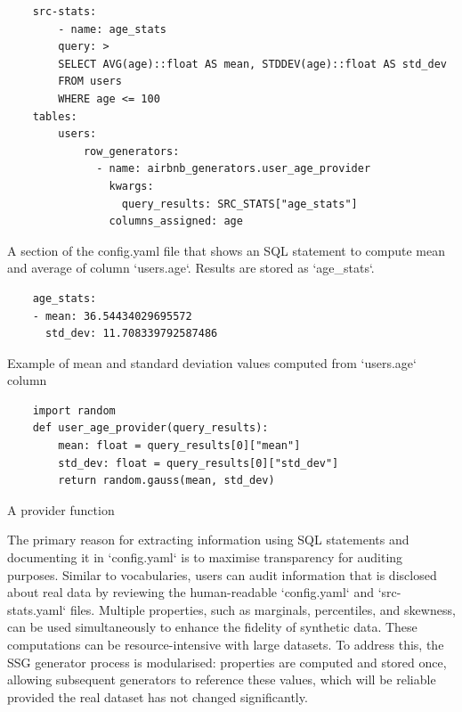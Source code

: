 \documentclass[11pt]{article}
\begin{document}
\begin{listing}[H]
\begin{verbatim}
    src-stats:
        - name: age_stats
        query: >
        SELECT AVG(age)::float AS mean, STDDEV(age)::float AS std_dev
        FROM users
        WHERE age <= 100
    tables:
        users:
            row_generators:
              - name: airbnb_generators.user_age_provider
                kwargs:
                  query_results: SRC_STATS["age_stats"]
                columns_assigned: age
\end{verbatim}
\caption{A section of the config.yaml file that shows an SQL statement to compute mean and average of column `users.age`. Results are stored as `age\_stats`. }
\label{lst:define sql and row generator in config.yaml}
\end{listing}

\begin{listing}[H]
\begin{verbatim}
    age_stats:
    - mean: 36.54434029695572
      std_dev: 11.708339792587486
\end{verbatim}
\caption{Example of mean and standard deviation values computed from `users.age` column}
\label{lst:age_stats src-stats.yaml}
\end{listing}

\begin{listing}[H]
\begin{verbatim}
    import random
    def user_age_provider(query_results):
        mean: float = query_results[0]["mean"]
        std_dev: float = query_results[0]["std_dev"]
        return random.gauss(mean, std_dev)
\end{verbatim} 
\caption{A provider function }
\label{lst:provider-function}
\end{listing}

The primary reason for extracting information using SQL statements and documenting it in `config.yaml` is to maximise transparency for auditing purposes. Similar to vocabularies, users can audit information that is disclosed about real data by reviewing the human-readable `config.yaml` and `src-stats.yaml` files. Multiple properties, such as marginals, percentiles, and skewness, can be used simultaneously to enhance the fidelity of synthetic data. These computations can be resource-intensive with large datasets. To address this, the SSG generator process is modularised: properties are computed and stored once, allowing subsequent generators to  reference these values, which will be reliable provided the real dataset has not changed significantly.
\end{document}
